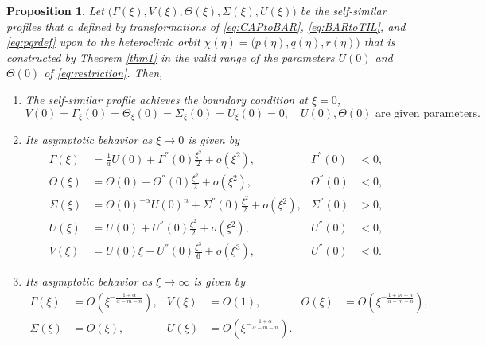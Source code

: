 \documentclass[a4paper,11pt]{article}
\newtheorem{proposition}{Proposition}[section]
\begin{document}
% 
% 
\begin{proposition}
Let $\big(\Gamma(\xi),V(\xi),\Theta(\xi),\Sigma(\xi),U(\xi)\big)$ be the self-similar profiles that a defined by transformations of \eqref{eq:CAPtoBAR}, \eqref{eq:BARtoTIL}, and \eqref{eq:pqrdef} upon to the heteroclinic orbit $\chi(\eta)=\big(p(\eta),q(\eta),r(\eta)\big)$ that is constructed by Theorem \ref{thm1} in the valid range of the parameters $U(0)$ and $\Theta(0)$ of \eqref{eq:restriction}. Then, 
 \begin{enumerate}
  \item[(i)] The self-similar profile achieves the boundary condition at $\xi=0$,
    \begin{equation*}
    {V}(0) = \Gamma_\xi(0) = \Theta_\xi(0)=\Sigma_\xi(0) = {U}_\xi(0)=0, \quad \text{$U(0), \Theta(0)$ are given parameters.}
  \end{equation*}
  \item[(ii)] Its asymptotic behavior as $\xi \rightarrow 0$ is given by 
  \begin{equation} \label{eq:ss_asymp0}
  \begin{aligned}
    \Gamma(\xi) &= \frac{1}{a}U(0) + \Gamma^{''}(0)\frac{\xi^2}{2} + o(\xi^2), & \Gamma^{''}(0)&<0,\\
    \Theta(\xi) &= \Theta(0) + \Theta^{''}(0)\frac{\xi^2}{2} + o(\xi^2), & \Theta^{''}(0)&<0,\\
    \Sigma(\xi) &= \Theta(0)^{-\alpha}{U(0)^n}+ \Sigma^{''}(0)\frac{\xi^2}{2} + o(\xi^2), & \Sigma^{''}(0)&>0, \\
    U(\xi) &= U(0) + U^{''}(0)\frac{\xi^2}{2} + o(\xi^2), & U^{''}(0)&<0,\\
    V(\xi) &= U(0)\xi + U^{''}(0)\frac{\xi^3}{6} + o(\xi^3), & U^{''}(0)&<0.
  \end{aligned}
  \end{equation}
  \item[(iii)] Its asymptotic behavior as $\xi \rightarrow \infty$ is given by
  \begin{equation} \label{eq:ss_asymp1}
  \begin{aligned}
    \Gamma(\xi) &= O(\xi^{-\frac{1+\alpha}{\alpha-m-n}}), & V(\xi) &= O(1), &    \Theta(\xi) &= O(\xi^{-\frac{1+m+n}{\alpha-m-n}}),\\
   \Sigma(\xi) &= O(\xi), &   U(\xi) &= O(\xi^{-\frac{1+\alpha}{\alpha-m-n}}).
  \end{aligned}
  \end{equation}
 \end{enumerate}
 
\end{proposition}
\end{document}
